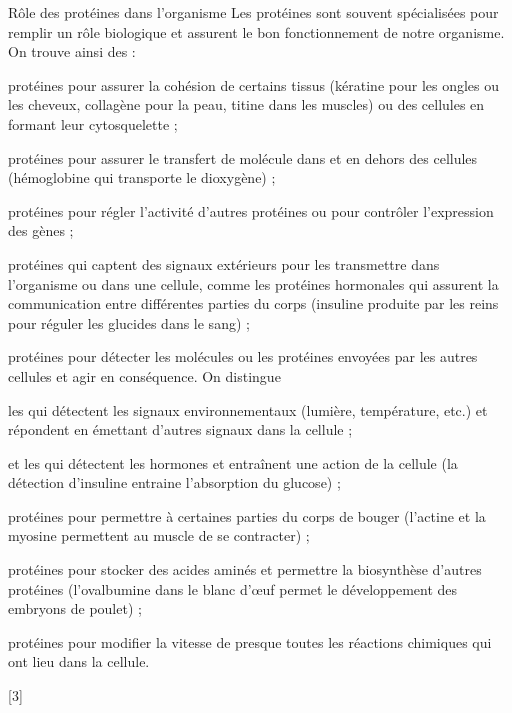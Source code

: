 \begin{doc}{Rôle des protéines dans l'organisme}
  Les protéines sont souvent spécialisées pour remplir un rôle biologique et assurent le bon fonctionnement de notre organisme.
  On trouve ainsi des :
  \begin{listePoints}
    \item protéines  pour assurer la cohésion de certains tissus (kératine pour les ongles ou les cheveux, collagène pour la peau, titine dans les muscles) ou des cellules en formant leur cytosquelette ;
    \item protéines  pour assurer le transfert de molécule dans et en dehors des cellules (hémoglobine qui transporte le dioxygène) ;
    \item protéines  pour régler l'activité d'autres protéines ou pour contrôler l'expression des gènes ;
    \item protéines  qui captent des signaux extérieurs pour les transmettre dans l'organisme ou dans une cellule, comme les protéines hormonales qui assurent la communication entre différentes parties du corps (insuline produite par les reins pour réguler les glucides dans le sang) ;
    \item protéines  pour détecter les molécules ou les protéines envoyées par les autres cellules et agir en conséquence. On distingue
    \begin{listePoints}
      \item les  qui détectent les signaux environnementaux (lumière, température, etc.) et répondent en émettant d'autres signaux dans la cellule ;
      \item et les  qui détectent les hormones et entraînent une action de la cellule (la détection d'insuline entraine l'absorption du glucose) ;
    \end{listePoints}
    \item protéines  pour permettre à certaines parties du corps de bouger (l'actine et la myosine permettent au muscle de se contracter) ;
    \item protéines  pour stocker des acides aminés et permettre la biosynthèse d'autres protéines (l'ovalbumine dans le blanc d’œuf permet le développement des embryons de poulet) ;
    \item protéines  pour modifier la vitesse de presque toutes les réactions chimiques qui ont lieu dans la cellule.  
  \end{listePoints}
\end{doc}

[3]

